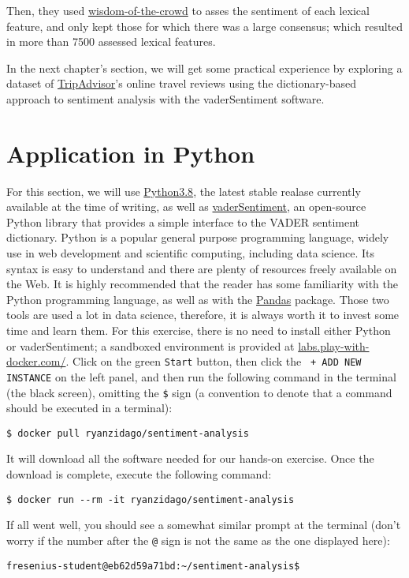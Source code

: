 	Then, they used \href{https://en.wikipedia.org/wiki/Wisdom_of_the_crowd}{wisdom-of-the-crowd} to asses the sentiment of each lexical feature, and only kept those for which there was a large consensus; which resulted in more than 7500 assessed lexical features.
	
	In the next chapter's section, we will get some practical experience by exploring a dataset of \href{https://www.tripadvisor.com/}{TripAdvisor}'s online travel reviews using the dictionary-based approach to sentiment analysis with the vaderSentiment software.
	\section{Application in Python}\label{sec:applicationsinR}
	For this section, we will use \href{https://www.python.org/}{Python3.8}, the latest stable realase currently available at the time of writing, as well as \href{https://github.com/cjhutto/vaderSentiment}{vaderSentiment}, an open-source Python library that provides a simple interface to the VADER sentiment dictionary. Python is a popular general purpose programming language, widely use in web development and scientific computing, including data science. Its syntax is easy to understand and there are plenty of resources freely available on the Web. It is highly recommended that the reader has some familiarity with the Python programming language, as well as with the \href{https://pandas.pydata.org/}{Pandas} package. Those two tools are used a lot in data science, therefore, it is always worth it to invest some time and learn them. For this exercise, there is no need to install either Python or vaderSentiment; a sandboxed environment is provided at \href{https://labs.play-with-docker.com/#}{labs.play-with-docker.com/}. Click on the green \verb#Start# button, then click the \verb# + ADD NEW INSTANCE# on the left panel, and then run the following command in the terminal (the black screen), omitting the \verb#$# sign (a convention to denote that a command should be executed in a terminal): 
	\begin{Verbatim}
$ docker pull ryanzidago/sentiment-analysis
	\end{Verbatim}
	It will download all the software needed for our hands-on exercise. Once the download is complete, execute the following command:
	\begin{Verbatim}
$ docker run --rm -it ryanzidago/sentiment-analysis
	\end{Verbatim}
	If all went well, you should see a somewhat similar prompt at the terminal (don't worry if the number after the \verb#@# sign is not the same as the one displayed here):
	\begin{Verbatim}
fresenius-student@eb62d59a71bd:~/sentiment-analysis$
	\end{Verbatim}
	
